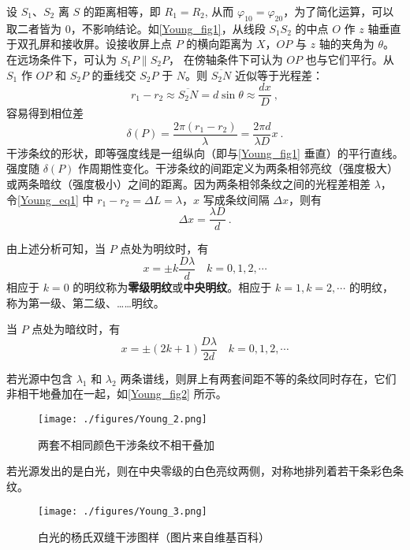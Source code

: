 设 $S_1$、$S_2$ 离 $S$ 的距离相等，即 $R_1=R_2$, 从而 $\varphi_{10}=\varphi_{20}$，为了简化运算，可以取二者皆为 $0$，不影响结论。如\autoref{Young_fig1}，从线段 $S_1S_2$ 的中点 $O$ 作 $z$ 轴垂直于双孔屏和接收屏。设接收屏上点 $P$ 的横向距离为 $X$，$OP$ 与 $z$ 轴的夹角为 $\theta$。在远场条件下，可认为 $S_1P\parallel S_2P$， 在傍轴条件下可认为 $OP$ 也与它们平行。从 $S_1$ 作 $OP$ 和 $S_2P$ 的垂线交 $S_2P$ 于 $N$。则 $\overline{S_2N}$ 近似等于光程差：
\begin{equation} \label{Young_eq1}
r_{1}-r_{2} \approx \overline{S_{2} N}=d \sin \theta \approx \frac{d x}{D}~,
\end{equation}
容易得到相位差
\begin{equation}
\delta(P)=\frac{2 \pi\left(r_{1}-r_{2}\right)}{\lambda}=\frac{2 \pi d}{\lambda D} x~.
\end{equation}
干涉条纹的形状，即等强度线是一组纵向（即与\autoref{Young_fig1} 垂直）的平行直线。强度随 $\delta(P)$ 作周期性变化。干涉条纹的间距定义为两条相邻亮纹（强度极大）或两条暗纹（强度极小）之间的距离。因为两条相邻条纹之间的光程差相差 $\lambda$， 令\autoref{Young_eq1} 中 $r_1-r_2=\Delta L=\lambda$，$ x $ 写成条纹间隔 $\Delta x$，则有
\begin{equation}
\Delta x=\frac{\lambda D}{d}~.
\end{equation}

由上述分析可知，当 $P$ 点处为明纹时，有
\begin{equation}
x=\pm k \frac{D \lambda}{d} \quad k=0,1,2, \cdots
\end{equation}
相应于 $k=0$ 的明纹称为\textbf{零级明纹}或\textbf{中央明纹}。相应于 $k=1, k=2, \cdots$ 的明纹，称为第一级、第二级、……明纹。

当 $P$ 点处为暗纹时，有
\begin{equation}
x=\pm(2 k+1) \frac{D \lambda}{2 d} \quad k=0,1,2, \cdots
\end{equation}

若光源中包含 $\lambda_1$ 和 $\lambda_2$ 两条谱线，则屏上有两套间距不等的条纹同时存在，它们非相干地叠加在一起，如\autoref{Young_fig2} 所示。
\begin{figure}[ht]
\centering
\texttt{[image: ./figures/Young\_2.png]}
\caption{两套不相同颜色干涉条纹不相干叠加} \label{Young_fig2}
\end{figure}
若光源发出的是白光，则在中央零级的白色亮纹两侧，对称地排列着若干条彩色条纹。
\begin{figure}[ht]
\centering
\texttt{[image: ./figures/Young\_3.png]}
\caption{白光的杨氏双缝干涉图样（图片来自维基百科）} \label{Young_fig3}
\end{figure}
